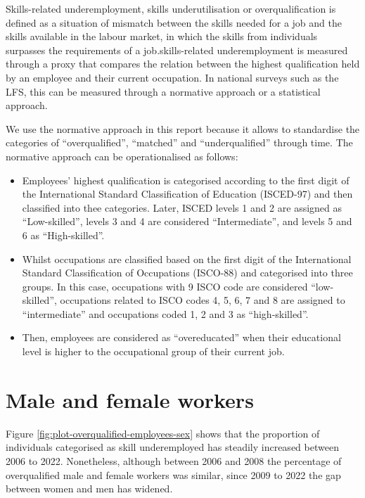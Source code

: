 \documentclass[
]{book}
\begin{document}
Skills-related underemployment, skills underutilisation or overqualification is defined as a situation of mismatch between the skills needed for a job and the skills available in the labour market, in which the skills from individuals surpasses the requirements of a job.skills-related underemployment is measured through a proxy that compares the relation between the highest qualification held by an employee and their current occupation. In national surveys such as the LFS, this can be measured through a normative approach or a statistical approach.

We use the normative approach in this report because it allows to standardise the categories of ``overqualified'', ``matched'' and ``underqualified'' through time. The normative approach can be operationalised as follows:

\begin{itemize}
\item
  Employees' highest qualification is categorised according to the first digit of the International Standard Classification of Education (ISCED-97) and then classified into thee categories. Later, ISCED levels 1 and 2 are assigned as ``Low-skilled'', levels 3 and 4 are considered ``Intermediate'', and levels 5 and 6 as ``High-skilled''.
\item
  Whilst occupations are classified based on the first digit of the International Standard Classification of Occupations (ISCO-88) and categorised into three groups. In this case, occupations with 9 ISCO code are considered ``low-skilled'', occupations related to ISCO codes 4, 5, 6, 7 and 8 are assigned to ``intermediate'' and occupations coded 1, 2 and 3 as ``high-skilled''.
\item
  Then, employees are considered as ``overeducated'' when their educational level is higher to the occupational group of their current job.
\end{itemize}

\hypertarget{male-and-female-workers-3}{%
\section{Male and female workers}\label{male-and-female-workers-3}}

Figure \ref{fig:plot-overqualified-employees-sex} shows that the proportion of individuals categorised as skill underemployed has steadily increased between 2006 to 2022. Nonetheless, although between 2006 and 2008 the percentage of overqualified male and female workers was similar, since 2009 to 2022 the gap between women and men has widened.
\end{document}
